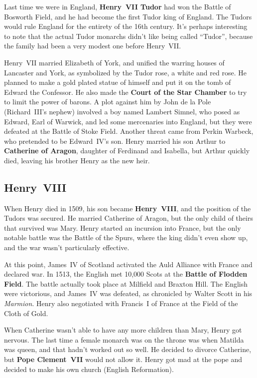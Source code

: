 Last time we were in England, \textbf{Henry~VII Tudor} had won the Battle of Bosworth Field,
and he had become the first Tudor king of England.
The Tudors would rule England for the entirety of the 16th century.
It's perhaps interesting to note that the actual Tudor monarchs didn't like being called ``Tudor'',
because the family had been a very modest one before Henry~VII\@.

Henry~VII married Elizabeth of York, and unified the warring houses of Lancaster and York,
as symbolized by the Tudor rose, a white and red rose.
He planned to make a gold plated statue of himself and put it on the tomb of Edward the Confessor.
He also made the \textbf{Court of the Star Chamber} to try to limit the power of barons.
A plot against him by John de la Pole (Richard~III's nephew) involved a boy named Lambert Simnel,
who posed as Edward, Earl of Warwick,
and led some mercenaries into England, but they were defeated at the Battle of Stoke Field.
Another threat came from Perkin Warbeck, who pretended to be Edward~IV's son.
Henry married his son Arthur to \textbf{Catherine of Aragon}, daughter of Ferdinand and Isabella,
but Arthur quickly died, leaving his brother Henry as the new heir.

\subsection*{Henry~VIII}

When Henry died in 1509, his son became \textbf{Henry~VIII}, and the position of the Tudors was secured.
He married Catherine of Aragon, but the only child of theirs that survived was Mary.
Henry started an incursion into France, but the only notable battle was the Battle of the Spurs,
where the king didn't even show up, and the war wasn't particularly effective.

At this point, James~IV of Scotland activated the Auld Alliance with France and declared war.
In 1513, the English met 10,000 Scots at the \textbf{Battle of Flodden Field}.
The battle actually took place at Milfield and Braxton Hill.
The English were victorious, and James~IV was defeated, as chronicled by Walter Scott in his \textit{Marmion}.
Henry also negotiated with Francis~I of France at the Field of the Cloth of Gold.

When Catherine wasn't able to have any more children than Mary, Henry got nervous.
The last time a female monarch was on the throne was when Matilda was queen,
and that hadn't worked out so well.
He decided to divorce Catherine, but \textbf{Pope Clement~VII} would not allow it.
Henry got mad at the pope and decided to make his own church (English Reformation).

